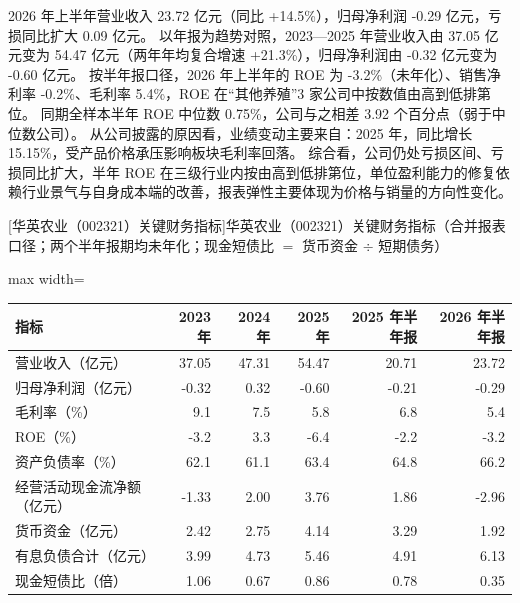  2026 年上半年营业收入 23.72 亿元（同比 +14.5\%），归母净利润 -0.29 亿元，亏损同比扩大 0.09 亿元。 以年报为趋势对照，2023---2025 年营业收入由 37.05 亿元变为 54.47 亿元（两年年均复合增速 +21.3\%），归母净利润由 -0.32 亿元变为 -0.60 亿元。 按半年报口径，2026 年上半年的 ROE 为 -3.2\%（未年化）、销售净利率 -0.2\%、毛利率 5.4\%，ROE 在“其他养殖”3 家公司中按数值由高到低排第位。 同期全样本半年 ROE 中位数 0.75\%，公司与之相差 3.92 个百分点（弱于中位数公司）。 从公司披露的原因看，业绩变动主要来自：2025 年，同比增长 15.15\%，受产品价格承压影响板块毛利率回落。 综合看，公司仍处亏损区间、亏损同比扩大，半年 ROE 在三级行业内按由高到低排第位，单位盈利能力的修复依赖行业景气与自身成本端的改善，报表弹性主要体现为价格与销量的方向性变化。

\begin{center}\small\setlength{\tabcolsep}{3.4pt}
[华英农业（002321）关键财务指标]{华英农业（002321）关键财务指标（合并报表口径；两个半年报期均未年化；现金短债比 $=$ 货币资金 $\div$ 短期债务）}
\begin{adjustbox}{max width=\textwidth}
\begin{tabular}{@{}lrrrrr@{}}
\toprule
指标 & 2023 年 & 2024 年 & 2025 年 & 2025 年半年报 & 2026 年半年报 \\
\midrule
营业收入（亿元） & 37.05 & 47.31 & 54.47 & 20.71 & 23.72 \\
归母净利润（亿元） & -0.32 & 0.32 & -0.60 & -0.21 & -0.29 \\
毛利率（\%） & 9.1 & 7.5 & 5.8 & 6.8 & 5.4 \\
ROE（\%） & -3.2 & 3.3 & -6.4 & -2.2 & -3.2 \\
资产负债率（\%） & 62.1 & 61.1 & 63.4 & 64.8 & 66.2 \\
经营活动现金流净额（亿元） & -1.33 & 2.00 & 3.76 & 1.86 & -2.96 \\
货币资金（亿元） & 2.42 & 2.75 & 4.14 & 3.29 & 1.92 \\
有息负债合计（亿元） & 3.99 & 4.73 & 5.46 & 4.91 & 6.13 \\
现金短债比（倍） & 1.06 & 0.67 & 0.86 & 0.78 & 0.35 \\
\bottomrule
\end{tabular}
\end{adjustbox}
\end{center}

